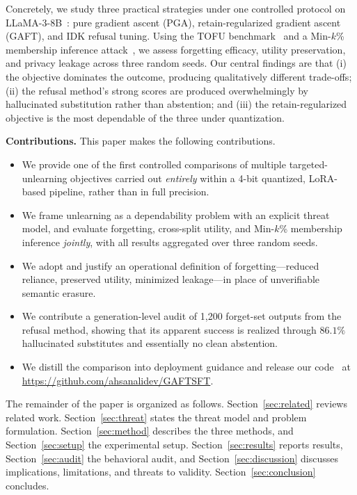 \documentclass[journal]{IEEEtran}
\begin{document}
Concretely, we study three practical strategies under one controlled protocol on LLaMA-3-8B~\cite{dubey2024llama3}: pure gradient ascent (PGA), retain-regularized gradient ascent (GAFT), and IDK refusal tuning. Using the TOFU benchmark~\cite{maini2024tofu} and a Min-$k$\% membership inference attack~\cite{shi2024minkprob,shokri2017mia}, we assess forgetting efficacy, utility preservation, and privacy leakage across three random seeds. Our central findings are that (i) the objective dominates the outcome, producing qualitatively different trade-offs; (ii) the refusal method's strong scores are produced overwhelmingly by hallucinated substitution rather than abstention; and (iii) the retain-regularized objective is the most dependable of the three under quantization.

\noindent\textbf{Contributions.} This paper makes the following contributions.
\begin{itemize}
\item We provide one of the first controlled comparisons of multiple targeted-unlearning objectives carried out \emph{entirely} within a 4-bit quantized, LoRA-based pipeline, rather than in full precision.
\item We frame unlearning as a dependability problem with an explicit threat model, and evaluate forgetting, cross-split utility, and Min-$k$\% membership inference \emph{jointly}, with all results aggregated over three random seeds.
\item We adopt and justify an operational definition of forgetting---reduced reliance, preserved utility, minimized leakage---in place of unverifiable semantic erasure.
\item We contribute a generation-level audit of 1{,}200 forget-set outputs from the refusal method, showing that its apparent success is realized through $86.1\%$ hallucinated substitutes and essentially no clean abstention.
\item We distill the comparison into deployment guidance and release our code~\cite{ali2026code} at \url{https://github.com/ahsanalidev/GAFTSFT}.
\end{itemize}

The remainder of the paper is organized as follows. Section~\ref{sec:related} reviews related work. Section~\ref{sec:threat} states the threat model and problem formulation. Section~\ref{sec:method} describes the three methods, and Section~\ref{sec:setup} the experimental setup. Section~\ref{sec:results} reports results, Section~\ref{sec:audit} the behavioral audit, and Section~\ref{sec:discussion} discusses implications, limitations, and threats to validity. Section~\ref{sec:conclusion} concludes.
\end{document}
